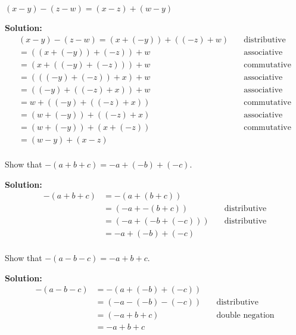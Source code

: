 \documentclass[6pt]{article}
\begin{document}
\begin{tcolorbox}[title=Problem 10, breakable]
$(x - y) - (z - w) = (x - z) + (w - y)$
\end{tcolorbox}

\textbf{Solution:}
\begin{align*}
(x - y) - (z - w)  = (x + (-y)) + ((-z) + w) & \quad \text{distributive} \\
=((x + (-y)) + (-z)) + w & \quad \text{associative} \\
=(x + ((-y) + (-z))) + w  & \quad \text{commutative} \\
=(((-y) + (-z)) + x) + w & \quad \text{associative} \\
=((-y) + ((-z) + x)) + w & \quad \text{associative} \\
=w + ((-y) + ((-z) + x)) & \quad \text{commutative} \\
=(w + (-y)) + ((-z) + x) & \quad \text{associative} \\
=(w + (-y)) + (x + (-z)) & \quad \text{commutative} \\
=(w - y) + (x - z) & \quad \text{} \\
\end{align*}


\begin{tcolorbox}[title=Problem 11, breakable]
Show that $-(a + b + c) = -a + (-b) + (-c)$.
\end{tcolorbox}

\textbf{Solution:}
\begin{align*}
-(a + b + c) &= -(a + (b + c)) & \quad \text{} \\
&= (-a + -(b + c)) & \quad \text{distributive} \\
&= (-a + (-b + (-c))) & \quad \text{distributive} \\
&= -a + (-b) + (-c) & \quad \text{} \\
\end{align*}

\begin{tcolorbox}[title=Problem 12, breakable]
Show that $-(a - b - c) = -a + b + c$.
\end{tcolorbox}

\textbf{Solution:}
\begin{align*}
-(a - b - c) &= -(a + (-b) + (-c)) & \quad \text{} \\
&= (-a - (-b) - (-c)) & \quad \text{distributive} \\
&= (-a + b + c) & \quad \text{double negation} \\
&= -a + b + c & \quad \text{} \\
\end{align*}
\end{document}
